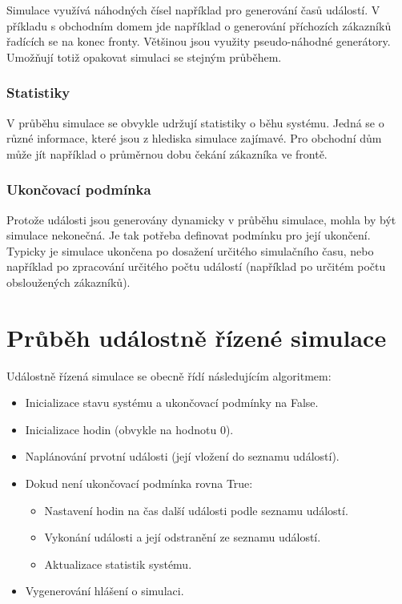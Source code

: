 Simulace využívá náhodných čísel například pro generování časů událostí. V příkladu s obchodním domem jde například o generování příchozích zákazníků řadících se na konec fronty. Většinou jsou využity pseudo-náhodné generátory. Umožňují totiž opakovat simulaci se stejným průběhem.

\subsubsection{Statistiky}

V průběhu simulace se obvykle udržují statistiky o běhu systému. Jedná se o různé informace, které jsou z hlediska simulace zajímavé. Pro obchodní dům může jít například o průměrnou dobu čekání zákazníka ve frontě.

\subsubsection{Ukončovací podmínka}

Protože události jsou generovány dynamicky v průběhu simulace, mohla by být simulace nekonečná. Je tak potřeba definovat podmínku pro její ukončení. Typicky je simulace ukončena po dosažení určitého simulačního času, nebo například po zpracování určitého počtu událostí (například po určitém počtu obsloužených zákazníků).

\section{Průběh událostně řízené simulace}

Událostně řízená simulace se obecně řídí následujícím algoritmem:

\begin{itemize}
\item Inicializace stavu systému a ukončovací podmínky na False. 
\item Inicializace hodin (obvykle na hodnotu 0).
\item Naplánování prvotní události (její vložení do seznamu událostí).
\item Dokud není ukončovací podmínka rovna True:
\begin{itemize}
\item Nastavení hodin na čas další události podle seznamu událostí.
\item Vykonání události a její odstranění ze seznamu událostí.
\item Aktualizace statistik systému.
\end{itemize}
\item Vygenerování hlášení o simulaci.
\end{itemize}

